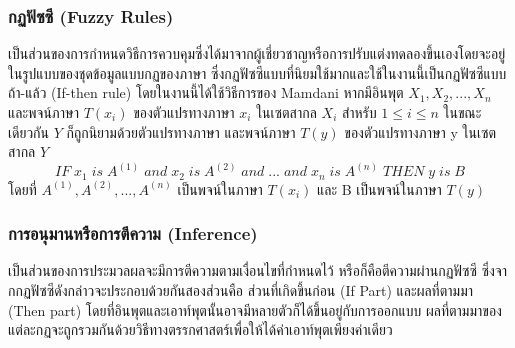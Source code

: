 \subsubsection{กฏฟัซซี (Fuzzy Rules)}
เป็นส่วนของการกำหนดวิธีการควบคุมซึ่งได้มาจากผู้เชี่ยวชาญหรือการปรับแต่งทดลองขึ้นเองโดยจะอยู่ในรูปแบบของชุดข้อมูลแบบกฏของภาษา ซึ่งกฏฟัซซีแบบที่นิยมใช้มากและใช้ในงานนี้เป็นกฏฟัซซีแบบ ถ้า-แล้ว (If-then rule)
โดยในงานนี้ได้ใช้วิธีการของ Mamdani หากมีอินพุต \(X_{1},X_{2},...,X_{n}\) และพจน์ภาษา \(T(x_{i})\) ของตัวแปรทางภาษา \(x_{i}\) ในเซตสากล \(X_{i}\) สำหรับ \(1 \le i \le n\) ในขณะเดียวกัน \(Y\) ก็ถูกนิยามด้วยตัวแปรทางภาษา และพจน์ภาษา \(T(y)\) ของตัวแปรทางภาษา y ในเซตสากล \(Y\)
\[ IF\; x_{1}\; is\; A^{(1)}\; and\; x_{2}\; is\; A^{(2)}\; and\; ... \; and\; x_{n}\; is\; A^{(n)}\; THEN\; y\; is\; B \]
โดยที่ \(A^{(1)},A^{(2)},...,A^{(n)}\) เป็นพจน์ในภาษา \(T(x_{i})\) และ B เป็นพจน์ในภาษา \(T(y)\)

\subsubsection{การอนุมานหรือการตีความ (Inference)}
เป็นส่วนของการประมวลผลจะมีการตีความตามเงื่อนไขที่กำหนดไว้ หรือก็คือตีความผ่านกฏฟัซซี ซึ่งจากกฏฟัซซีดังกล่าวจะประกอบด้วยกันสองส่วนคือ ส่วนที่เกิดขึ้นก่อน (If Part) และผลที่ตามมา (Then part) โดยที่อินพุตและเอาท์พุตนั้นอาจมีหลายตัวก็ได้ขึ้นอยู่กับการออกแบบ ผลที่ตามมาของแต่ละกฏจะถูกรวมกันด้วยวิธีทางตรรกศาสตร์เพื่อให้ได้ค่าเอาท์พุตเพียงค่าเดียว


